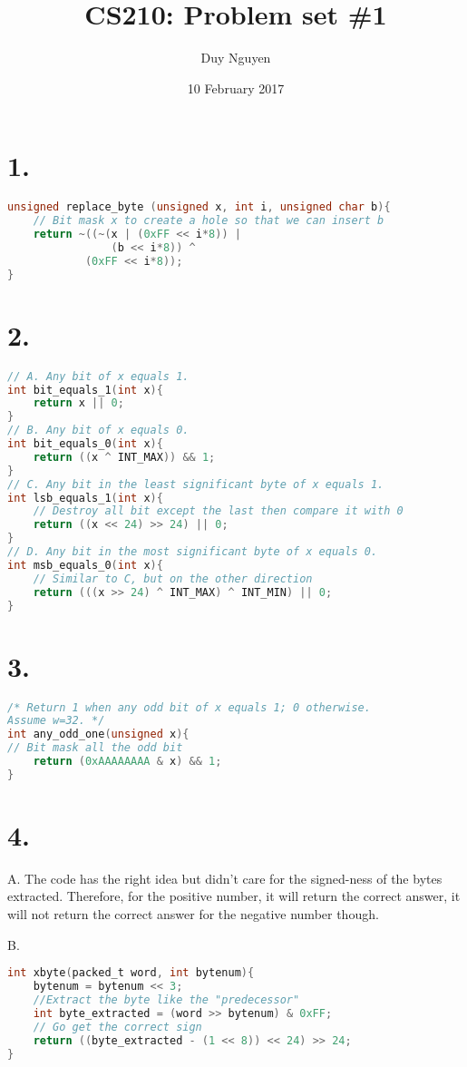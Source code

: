 \documentclass{article}
\title{CS210: Problem set \#1}
\author{Duy Nguyen}
\date{10 February 2017}
\begin{document}
\maketitle

\section*{1.}
\begin{lstlisting}[language=c]
unsigned replace_byte (unsigned x, int i, unsigned char b){
    // Bit mask x to create a hole so that we can insert b
    return ~((~(x | (0xFF << i*8)) | 
                (b << i*8)) ^ 
            (0xFF << i*8));
}
\end{lstlisting}
\section*{2.}
\begin{lstlisting}[language=c]
// A. Any bit of x equals 1.
int bit_equals_1(int x){
    return x || 0;
}
// B. Any bit of x equals 0.
int bit_equals_0(int x){
    return ((x ^ INT_MAX)) && 1;
}
// C. Any bit in the least significant byte of x equals 1.
int lsb_equals_1(int x){
    // Destroy all bit except the last then compare it with 0
    return ((x << 24) >> 24) || 0;
}
// D. Any bit in the most significant byte of x equals 0.
int msb_equals_0(int x){
    // Similar to C, but on the other direction
    return (((x >> 24) ^ INT_MAX) ^ INT_MIN) || 0;
}
\end{lstlisting}
\section*{3.}
\begin{lstlisting}[language=c]
/* Return 1 when any odd bit of x equals 1; 0 otherwise.
Assume w=32. */
int any_odd_one(unsigned x){
// Bit mask all the odd bit
    return (0xAAAAAAAA & x) && 1;
}
\end{lstlisting}
\section*{4.}
A. The code has the right idea but didn't care for the signed-ness of the bytes extracted. Therefore, for the positive number, it will return the correct answer, it will not return the correct answer for the negative number though.

B. 
\begin{lstlisting}[language=c]
int xbyte(packed_t word, int bytenum){
    bytenum = bytenum << 3;
    //Extract the byte like the "predecessor"
    int byte_extracted = (word >> bytenum) & 0xFF; 
    // Go get the correct sign
    return ((byte_extracted - (1 << 8)) << 24) >> 24;
}
\end{lstlisting}
\end{document}
